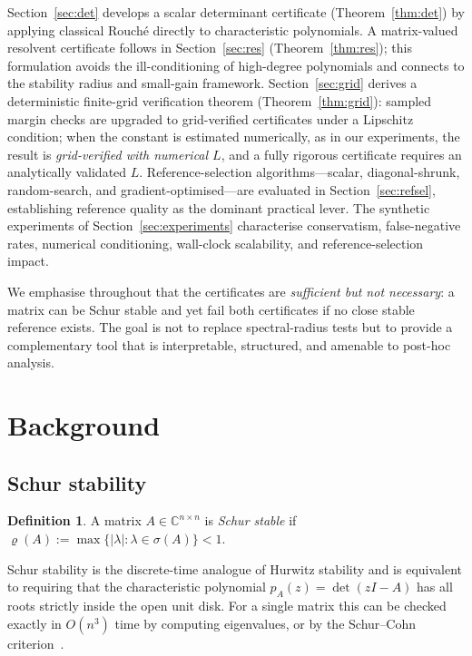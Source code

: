 \documentclass{article}
\theoremstyle{definition}
\newtheorem{definition}{Definition}
\newcommand{\C}{\mathbb{C}}
\newcommand{\abs}[1]{\left|#1\right|}
\begin{document}
Section~\ref{sec:det} develops a scalar determinant certificate
(Theorem~\ref{thm:det}) by applying classical Rouch\'e directly to
characteristic polynomials.  A matrix-valued resolvent certificate follows in
Section~\ref{sec:res} (Theorem~\ref{thm:res}); this formulation avoids the
ill-conditioning of high-degree polynomials and connects to the stability radius
and small-gain framework.  Section~\ref{sec:grid} derives a deterministic
finite-grid verification theorem (Theorem~\ref{thm:grid}): sampled margin
checks are upgraded to grid-verified certificates under a Lipschitz condition;
when the constant is estimated numerically, as in our experiments, the result
is \emph{grid-verified with numerical $L$}, and a fully rigorous certificate
requires an analytically validated $L$.  Reference-selection
algorithms---scalar, diagonal-shrunk, random-search, and gradient-optimised---are
evaluated in Section~\ref{sec:refsel}, establishing reference quality as the
dominant practical lever.  The synthetic experiments of
Section~\ref{sec:experiments} characterise conservatism, false-negative rates,
numerical conditioning, wall-clock scalability, and reference-selection impact.

We emphasise throughout that the certificates are \emph{sufficient but not
necessary}: a matrix can be Schur stable and yet fail both certificates if no
close stable reference exists.  The goal is not to replace spectral-radius
tests but to provide a complementary tool that is interpretable, structured,
and amenable to post-hoc analysis.

\section{Background}
\label{sec:background}

\subsection{Schur stability}

\begin{definition}
A matrix $A \in \C^{n \times n}$ is \emph{Schur stable} if
$\varrho(A) := \max\{\abs{\lambda} : \lambda \in \sigma(A)\} < 1$.
\end{definition}

Schur stability is the discrete-time analogue of Hurwitz stability and is
equivalent to requiring that the characteristic polynomial
$p_A(z) = \det(zI - A)$ has all roots strictly inside the open unit disk.
For a single matrix this can be checked exactly in $O(n^3)$ time by computing
eigenvalues, or by the Schur--Cohn criterion~\cite{jury1964inners}.
\end{document}
